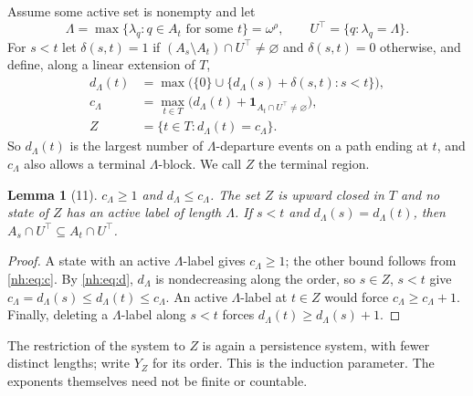 \documentclass[11pt,a4paper]{article}
\newtheorem{lemma}[theorem]{Lemma}
\theoremstyle{definition}
\theoremstyle{remark}
\begin{document}
Assume some active set is nonempty and let
\[
 \Lambda=\max\{\lambda_q:q\in A_t\text{ for some }t\}=\omega^{\rho},\qquad
 U^{\top}=\{q:\lambda_q=\Lambda\}.
\]
For $s<t$ let $\delta(s,t)=1$ if $(A_s\setminus A_t)\cap U^\top\ne\varnothing$
and $\delta(s,t)=0$ otherwise, and define, along a linear extension of $T$,
\begin{align}
 d_\Lambda(t)&=\max\bigl(\{0\}\cup\{d_\Lambda(s)+\delta(s,t):s<t\}\bigr),
   \label{nh:eq:d}\\
 c_\Lambda&=\max_{t\in T}\bigl(d_\Lambda(t)+\mathbf 1_{A_t\cap U^\top\ne\varnothing}\bigr),
   \label{nh:eq:c}\\
 Z&=\{t\in T:d_\Lambda(t)=c_\Lambda\}.\label{nh:eq:Z}
\end{align}
So $d_\Lambda(t)$ is the largest number of $\Lambda$-departure events on a path
ending at $t$, and $c_\Lambda$ also allows a terminal $\Lambda$-block. We call
$Z$ the terminal region.

\begin{lemma}[11]\label{nh:lem:leadingdata}
$c_\Lambda\ge1$ and $d_\Lambda\le c_\Lambda$. The set $Z$ is upward closed in
$T$ and no state of $Z$ has an active label of length $\Lambda$. If $s<t$ and
$d_\Lambda(s)=d_\Lambda(t)$, then $A_s\cap U^\top\subseteq A_t\cap U^\top$.
\end{lemma}
\begin{proof}
A state with an active $\Lambda$-label gives $c_\Lambda\ge1$; the other bound
follows from \eqref{nh:eq:c}. By \eqref{nh:eq:d}, $d_\Lambda$ is nondecreasing
along the order, so $s\in Z$, $s<t$ give
$c_\Lambda=d_\Lambda(s)\le d_\Lambda(t)\le c_\Lambda$. An active
$\Lambda$-label at $t\in Z$ would force $c_\Lambda\ge c_\Lambda+1$. Finally,
deleting a $\Lambda$-label along $s<t$ forces $d_\Lambda(t)\ge d_\Lambda(s)+1$.
\end{proof}

The restriction of the system to $Z$ is again a persistence system, with fewer
distinct lengths; write $Y_Z$ for its order. This is the induction parameter.
The exponents themselves need not be finite or countable.
\end{document}
